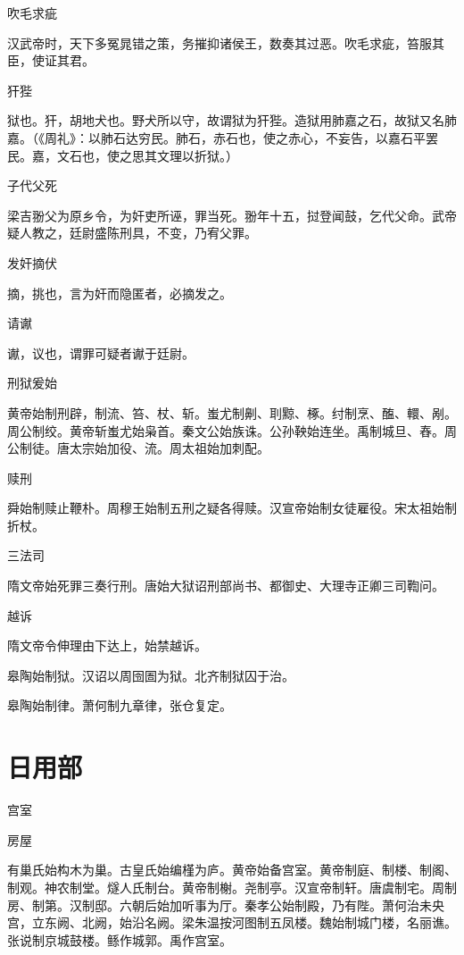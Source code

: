 \documentclass[a4paper,12pt,UTF8,twoside]{ctexbook}
\begin{document}
    吹毛求疵
    
    汉武帝时，天下多冤晁错之策，务摧抑诸侯王，数奏其过恶。吹毛求疵，笞服其臣，使证其君。
    
    犴狴
    
    狱也。犴，胡地犬也。野犬所以守，故谓狱为犴狴。造狱用肺嘉之石，故狱又名肺嘉。（《周礼》：以肺石达穷民。肺石，赤石也，使之赤心，不妄告，以嘉石平罢民。嘉，文石也，使之思其文理以折狱。）
    
    子代父死
    
    梁吉翂父为原乡令，为奸吏所诬，罪当死。翂年十五，挝登闻鼓，乞代父命。武帝疑人教之，廷尉盛陈刑具，不变，乃宥父罪。
    
    发奸摘伏
    
    摘，挑也，言为奸而隐匿者，必摘发之。
    
    请谳
    
    谳，议也，谓罪可疑者谳于廷尉。
    
    刑狱爰始
    
    黄帝始制刑辟，制流、笞、杖、斩。蚩尤制劓、刵黥、椓。纣制烹、醢、轘、剐。周公制绞。黄帝斩蚩尤始枭首。秦文公始族诛。公孙鞅始连坐。禹制城旦、舂。周公制徒。唐太宗始加役、流。周太祖始加刺配。
    
    赎刑
    
    舜始制赎止鞭朴。周穆王始制五刑之疑各得赎。汉宣帝始制女徒雇役。宋太祖始制折杖。
    
    三法司
    
    隋文帝始死罪三奏行刑。唐始大狱诏刑部尚书、都御史、大理寺正卿三司鞫问。
    
    越诉
    
    隋文帝令伸理由下达上，始禁越诉。
    
    皋陶始制狱。汉诏以周囹圄为狱。北齐制狱囚于治。
    
    皋陶始制律。萧何制九章律，张仓复定。
    
    
    \part{日用部}
    
    宫室
    
    房屋
    
    有巢氏始构木为巢。古皇氏始编槿为庐。黄帝始备宫室。黄帝制庭、制楼、制阁、制观。神农制堂。燧人氏制台。黄帝制榭。尧制亭。汉宣帝制轩。唐虞制宅。周制房、制第。汉制邸。六朝后始加听事为厅。秦孝公始制殿，乃有陛。萧何治未央宫，立东阙、北阙，始沿名阙。梁朱温按河图制五凤楼。魏始制城门楼，名丽谯。张说制京城鼓楼。鲧作城郭。禹作宫室。
    
\end{document}
